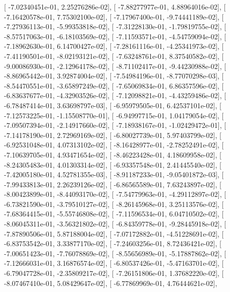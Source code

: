 \documentclass{article}
\begin{document}
       [ -7.02340451e-01,   2.25276286e-02],
       [ -7.88277977e-01,   4.88964016e-02],
       [ -7.16420578e-01,   7.75302100e-02],
       [ -7.17967400e-01,  -9.74441189e-02],
       [ -7.27936113e-01,  -5.99353818e-02],
       [ -7.31228130e-01,  -1.79819755e-02],
       [ -8.57517063e-01,  -6.18103569e-02],
       [ -7.11593571e-01,  -4.54759094e-02],
       [ -7.18962630e-01,   6.14700427e-02],
       [ -7.28161116e-01,  -4.25341973e-02],
       [ -7.41190501e-01,  -8.02193121e-02],
       [ -7.63248761e-01,   8.37540582e-02],
       [ -9.00086930e-01,  -2.12964178e-02],
       [ -8.71102417e-01,  -9.44230988e-02],
       [ -8.86965442e-01,   3.92874004e-02],
       [ -7.54984196e-01,  -8.77070298e-03],
       [ -8.54470551e-01,  -3.65897249e-02],
       [ -7.65069834e-01,   6.86357596e-02],
       [ -6.83637677e-01,  -4.32903526e-02],
       [ -7.12098821e-01,  -4.43259486e-02],
       [ -6.78487414e-01,   3.63698797e-03],
       [ -6.95979505e-01,   6.42537101e-02],
       [ -7.12573225e-01,  -1.15508770e-01],
       [ -6.94997715e-01,   1.04179054e-02],
       [ -7.09507394e-01,  -2.14917660e-02],
       [ -7.18938167e-01,  -1.02429472e-01],
       [ -7.14178190e-01,   2.72969169e-02],
       [ -6.80027739e-01,   5.97403799e-02],
       [ -6.92531048e-01,   4.07313102e-02],
       [ -8.16428977e-01,  -2.78252491e-02],
       [ -7.10639705e-01,   4.93471654e-02],
       [ -8.46223428e-01,   4.18609958e-02],
       [ -8.24305483e-01,   4.01303314e-02],
       [ -6.93357548e-01,   2.41445540e-02],
       [ -7.42005180e-01,   4.52781355e-03],
       [ -8.91187233e-01,  -9.05401872e-03],
       [ -7.99433813e-01,   2.26239126e-02],
       [ -6.86565589e-01,   7.63243897e-02],
       [ -8.00423899e-01,  -8.44093170e-02],
       [ -7.54779963e-01,  -4.29112897e-02],
       [ -6.73821590e-01,  -3.79510127e-02],
       [ -8.26145968e-01,   3.25113576e-02],
       [ -7.68364415e-01,  -5.55746808e-02],
       [ -7.11596534e-01,   6.04710502e-02],
       [ -8.06045311e-01,  -3.56321802e-02],
       [ -6.84359778e-01,  -9.28445918e-02],
       [ -7.87890506e-01,   5.87188004e-02],
       [ -7.07172882e-01,  -4.51228691e-02],
       [ -6.83753542e-01,   3.33877170e-02],
       [ -7.24603256e-01,   8.72436421e-02],
       [ -7.00651423e-01,  -7.76078869e-02],
       [ -8.55656989e-01,  -5.17887862e-02],
       [ -7.12666031e-01,   3.16876574e-02],
       [ -6.80537426e-01,  -5.47163701e-02],
       [ -6.79047728e-01,  -2.35809217e-02],
       [ -7.26151806e-01,   1.37682220e-02],
       [ -8.07467410e-01,   5.08429647e-02],
       [ -6.77869969e-01,   4.76444621e-02],
\end{document}
